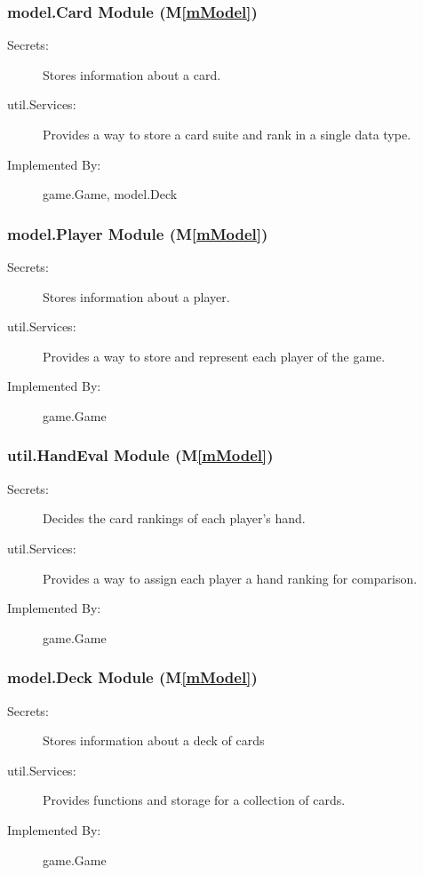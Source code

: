 \documentclass[12pt, titlepage]{article}
\newcommand{\mref}[1]{M\ref{#1}}
\begin{document}
\subsubsection{ model.Card Module (\mref{mModel})}
    \begin{description}
    \item[Secrets:] Stores information about a card.
    \item[util.Services:] Provides a way to store a card suite and rank in a single data type.
    \item[Implemented By:] game.Game, model.Deck
    \end{description}

\subsubsection{ model.Player Module (\mref{mModel})}
    \begin{description}
    \item[Secrets:] Stores information about a player.
    \item[util.Services:] Provides a way to store and represent each player of the game.
    \item[Implemented By:] game.Game
    \end{description}

\subsubsection{ util.HandEval Module (\mref{mModel})}
    \begin{description}
    \item[Secrets:] Decides the card rankings of each player's hand.
    \item[util.Services:] Provides a way to assign each player a hand ranking for comparison.
    \item[Implemented By:] game.Game
    \end{description}

\subsubsection{ model.Deck Module (\mref{mModel})}
    \begin{description}
    \item[Secrets:] Stores information about a deck of cards
    \item[util.Services:] Provides functions and storage for a collection of cards.
    \item[Implemented By:] game.Game
    \end{description}
    
\end{document}
